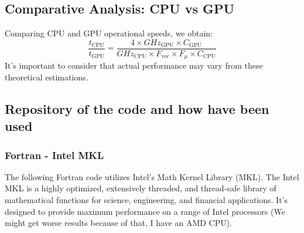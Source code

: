 \subsection{Comparative Analysis: CPU vs GPU}
Comparing CPU and GPU operational speeds, we obtain:
\begin{equation}
    \frac{t_{\text{CPU}}}{t_{\text{GPU}}} = \frac{4 \times GHz_{\text{GPU}} \times C_{\text{GPU}}}{GHz_{\text{CPU}} \times F_{\text{vec}} \times F_{\mu} \times C_{\text{CPU}}}
\end{equation}
It's important to consider that actual performance may vary from these theoretical estimations.


\clearpage

\subsection{Repository of the code and how have been used}

\subsubsection{Fortran - Intel MKL}

The following Fortran code utilizes Intel's Math Kernel Library (MKL). The Intel MKL is a highly optimized, extensively threaded, and thread-safe library of mathematical functions for science, engineering, and financial applications. It's designed to provide maximum performance on a range of Intel processors (We might get worse results because of that, I have an AMD CPU).



